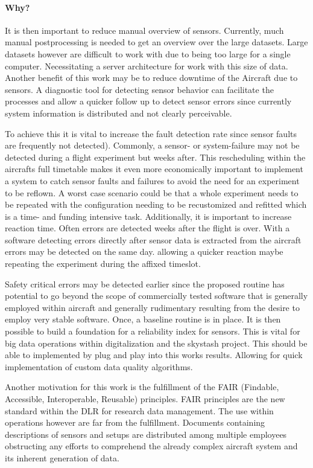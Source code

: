 \paragraph{Why?}

It is then important to reduce manual overview of sensors. Currently, much manual postprocessing is needed to get an overview over the large datasets. Large datasets however are difficult to work with due to being too large for a single computer. Necessitating a server architecture for work with this size of data.
Another benefit of this work may be to reduce downtime of the Aircraft due to sensors. A diagnostic tool for detecting sensor behavior can facilitate the processes and allow a quicker follow up to detect sensor errors since currently system information is distributed and not clearly perceivable.

To achieve this it is vital to increase the fault detection rate since sensor faults are frequently not detected). Commonly, a sensor- or system-failure may not be detected during a flight experiment but weeks after. This rescheduling within the aircrafts full timetable makes it even more economically important to implement a system to catch sensor faults and failures to avoid the need for an experiment to be reflown. A worst case scenario could be that a whole experiment needs to be repeated with the configuration needing to be recustomized and refitted which is a time- and funding intensive task.
Additionally, it is important to increase reaction time. Often errors are detected weeks after the flight is over. With a software detecting errors directly after sensor data is extracted from the aircraft errors may be detected on the same day. allowing a quicker reaction maybe repeating the experiment during the affixed timeslot.

Safety critical errors may be detected earlier since the proposed routine has potential to go beyond the scope of commercially tested software that is generally employed within aircraft and generally rudimentary resulting from the desire to employ very stable software.
Once, a baseline routine is in place. It is then possible to build a foundation for a reliability index for sensors. This is vital for big data operations within digitalization and the skystash project. This should be able to implemented by plug and play into this works results. Allowing for quick implementation of custom data quality algorithms.

Another motivation for this work is the fulfillment of the FAIR (Findable, Accessible, Interoperable, Reusable) principles. FAIR principles are the new standard within the DLR for research data management. The use within operations however are far from the fulfillment. Documents containing descriptions of sensors and setups are distributed among multiple employees obstructing any efforts to comprehend the already complex aircraft system and its inherent generation of data.

